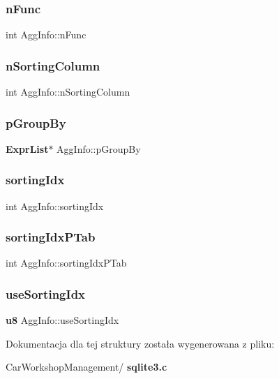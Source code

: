 \mbox{\label{struct_agg_info_a5bfde7ca00d28da6edbda523ab038e38}} 
\subsubsection{nFunc}
{\footnotesize\ttfamily int Agg\+Info\+::n\+Func}

\mbox{\label{struct_agg_info_a89925dccd1a0ec51d2a5a5dbaead66dc}} 
\subsubsection{nSortingColumn}
{\footnotesize\ttfamily int Agg\+Info\+::n\+Sorting\+Column}

\mbox{\label{struct_agg_info_aa8e942103d224c4db847743670907781}} 
\subsubsection{pGroupBy}
{\footnotesize\ttfamily \textbf{ Expr\+List}$\ast$ Agg\+Info\+::p\+Group\+By}

\mbox{\label{struct_agg_info_a97ce74f509ca908a616c123e7196797b}} 
\subsubsection{sortingIdx}
{\footnotesize\ttfamily int Agg\+Info\+::sorting\+Idx}

\mbox{\label{struct_agg_info_a7faac4c3996598960fc46f0c173b244c}} 
\subsubsection{sortingIdxPTab}
{\footnotesize\ttfamily int Agg\+Info\+::sorting\+Idx\+P\+Tab}

\mbox{\label{struct_agg_info_a8173a7ea13c4a12ce4befbcb40719073}} 
\subsubsection{useSortingIdx}
{\footnotesize\ttfamily \textbf{ u8} Agg\+Info\+::use\+Sorting\+Idx}



Dokumentacja dla tej struktury została wygenerowana z pliku\+:\begin{DoxyCompactItemize}
\item 
Car\+Workshop\+Management/\textbf{ sqlite3.\+c}\end{DoxyCompactItemize}
